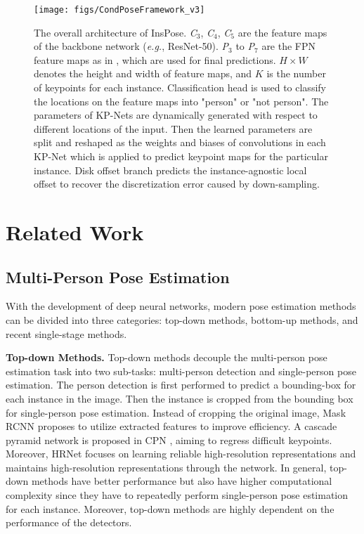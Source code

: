 \documentclass[sigconf]{acmart}
\begin{document}
\begin{figure*}[ht]
  \centering
  \texttt{[image: figs/CondPoseFramework\_v3]}
  \caption{The overall architecture of InsPose. \textit{C}$_{3}$, \textit{C}$_{4}$, \textit{C}$_{5}$ are the feature maps of the backbone network (\textit{e.g.}, ResNet-50). \textit{P}$_{3}$ to \textit{P}$_{7}$ are the FPN feature maps as in \cite{lin2017feature, tian2019fcos}, which are used for final predictions. $H \times W$ denotes the height and width of feature maps, and $K$ is the number of keypoints for each instance. Classification head is used to classify the locations on the feature maps into "person" or "not person".
  The parameters of KP-Nets are dynamically generated with respect to different locations of the input. Then the learned parameters are split and reshaped as the weights and biases of convolutions in each KP-Net which is applied to predict keypoint maps for the particular instance.
  Disk offset branch predicts the instance-agnostic local offset to recover the discretization error caused by down-sampling.}
  \label{fig:CondPose}
\end{figure*}

\section{Related Work}
\subsection{Multi-Person Pose Estimation}
With the development of deep neural networks, modern pose estimation methods can be divided into three categories: top-down methods, bottom-up methods, and recent single-stage methods.

\textbf{Top-down Methods.}\quad
Top-down methods decouple the multi-person pose estimation task into two sub-tasks: multi-person detection and single-person pose estimation.
The person detection is first performed to predict a bounding-box for each instance in the image.
Then the instance is cropped from the bounding box for single-person pose estimation.
Instead of cropping the original image, Mask RCNN \cite{he2017mask} proposes to utilize extracted features to improve efficiency.
A cascade pyramid network is proposed in CPN \cite{chen2018cascaded}, aiming to regress difficult keypoints.
Moreover, HRNet \cite{sun2019deep} focuses on learning reliable high-resolution representations and maintains high-resolution representations through the network.
In general, top-down methods have better performance but also have higher computational complexity since they have to repeatedly perform single-person pose estimation for each instance.
Moreover, top-down methods are highly dependent on the performance of the detectors.
\end{document}
